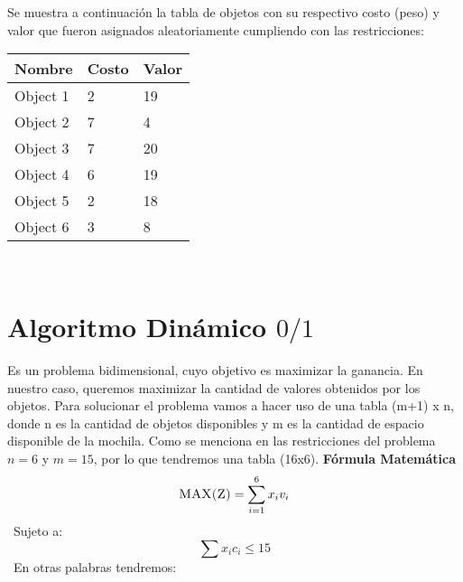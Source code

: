 \documentclass[10pt,letterpaper]{article}
\begin{document}
Se muestra a continuación la tabla de objetos con su respectivo costo (peso) y valor 
        que fueron asignados aleatoriamente cumpliendo con las restricciones: 
\begin{center}
\begin{tabu} to 0.6\textwidth { | X[l] | X[l] | X[l] | } 
\hline
{}
\textbf{Nombre} & \textbf{Costo} & \textbf{Valor}\\
\hline
Object 1 & 2 & 19 \\
\hline
Object 2 & 7 & 4 \\
\hline
Object 3 & 7 & 20 \\
\hline
Object 4 & 6 & 19 \\
\hline
Object 5 & 2 & 18 \\
\hline
Object 6 & 3 & 8 \\
\hline
\end{tabu} \\
\end{center}
\section{Algoritmo Dinámico $0/1$} 
        Es un problema bidimensional, cuyo objetivo es maximizar la ganancia. 
        En nuestro caso, queremos maximizar la cantidad de valores obtenidos por los objetos. 
        Para solucionar el problema vamos a hacer uso de una tabla (m+1) x n, donde n es la cantidad 
        de objetos disponibles y m es la cantidad de espacio disponible de la mochila. 
        Como se menciona en las restricciones del problema $n = 6$ y $m = 15$, por lo que tendremos 
        una tabla (16x6). \newline \newline \newline 
        \textbf{\Large Fórmula Matemática} 
        \[ \textsc{\normalsize MAX(Z)}\\[0.5cm] = \sum_{i=1}^{6}x_{i}v_{i} \] 
        \ Sujeto a:  
        \[ \sum x_{i}c_{i} \leq 15 \] 
        \ En otras palabras tendremos:  
        
\end{document}
